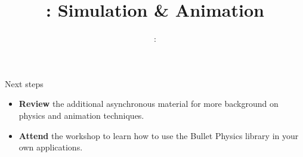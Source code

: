 \usepackage{../../beamerthemeFalmouthGamesAcademy}
\usepackage{multimedia}
\graphicspath{ {../../} }




\usepackage[normalem]{ulem}
\usepackage{wasysym}

\usepackage{pdfpages}

\usepackage{caption}
\captionsetup[figure]{font=scriptsize,labelfont=scriptsize}

\usetikzlibrary{arrows,automata}




\title{\sessionnumber: Simulation \& Animation}
\subtitle{\modulecode: \moduletitle}

\frame{\titlepage} 






\begin{frame}{Next steps}
	\begin{itemize}
		\item \textbf{Review} the additional asynchronous material for more background on physics and animation techniques.
		\item \textbf{Attend} the workshop to learn how to use the Bullet Physics library in your own applications.
	\end{itemize}
\end{frame}



